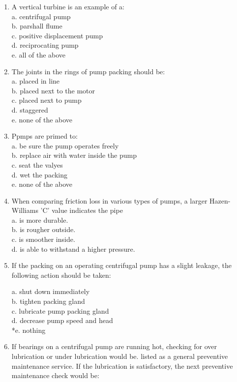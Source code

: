 \begin{enumerate}[1.]
\item A vertical turbine is an example of a:\\
a. centrifugal pump\\
b. parshall flume\\
c. positive displacement pump\\
d. reciprocating pump\\
e. all of the above\\

\item The joints in the rings of pump packing should be:\\
a. placed in line\\
b. placed next to the motor\\
c. placed next to pump\\
d. staggered\\
e. none of the above\\

\item Ppmps are primed to:\\
a. be sure the pump operates freely\\
b. replace air with water inside the pump\\
c. seat the valyes\\
d. wet the packing\\
e. none of the above\\

\item When comparing friction loss in various types of pumps, a larger Hazen-Williams 'C' value indicates the pipe\\
a. is more durable.\\
b. is rougher outside.\\
c. is smoother inside.\\
d. is able to withstand a higher pressure.\\


\item  If the packing on an operating centrifugal pump has a slight leakage, the following action should be taken: 

a. shut down immediately \\
b. tighten packing gland \\
c. lubricate pump packing gland \\
d. decrease pump speed and head \\
*e. nothing 


\item  If bearings on a centrifugal pump are running hot, checking for over lubrication or under lubrication would be. listed as a general preventive maintenance service. If the lubrication is satisfactory, the next preventive maintenance check would be: 


\end{enumerate}
